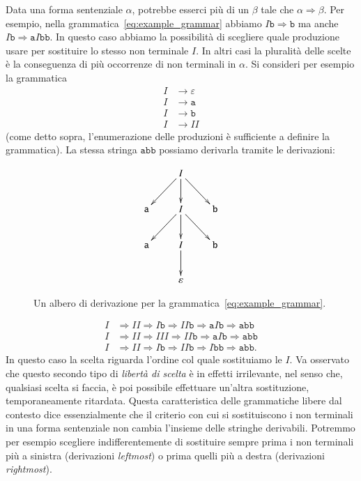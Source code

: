 Data una forma sentenziale $\alpha$, potrebbe esserci pi\`u di un
$\beta$ tale che $\alpha\Rightarrow\beta$. Per esempio, nella
grammatica~\eqref{eq:example_grammar} abbiamo
$I\mathtt{b}\Rightarrow\mathtt{b}$
ma anche $I\mathtt{b}\Rightarrow\mathtt{a}I\mathtt{bb}$.
In questo caso abbiamo la possibilit\`a di scegliere quale produzione
usare per sostituire lo stesso non terminale $I$. In altri casi la
pluralit\`a delle scelte \`e la conseguenza di pi\`u occorrenze
di non terminali in $\alpha$. Si consideri per esempio la grammatica
%
\begin{equation}\label{eq:other_grammar}
\begin{split}
  I&\to\varepsilon\\
  I&\to\mathtt{a}\\
  I&\to\mathtt{b}\\
  I&\to II
\end{split}
\end{equation}
%
(come detto sopra, l'enumerazione delle produzioni \`e sufficiente
a definire la grammatica). La stessa stringa
$\mathtt{abb}$ possiamo derivarla tramite le derivazioni:
%
\begin{figure}[t]
\[
\xymatrix{
  & I\ar[ld]\ar[d]\ar[rd] \\
\mathtt{a} & I\ar[ld]\ar[d]\ar[rd] & \mathtt{b}\\
\mathtt{a} & I\ar[d] & \mathtt{b}\\
  & \varepsilon
}
\]
\caption{Un albero di derivazione per la
         grammatica~\eqref{eq:example_grammar}.}\label{fig:parse_tree}
\end{figure}
%
\begin{equation}\label{eq:many_derivations}
\begin{split}
  I&\Rightarrow II\Rightarrow I\mathtt{b}\Rightarrow II\mathtt{b}
    \Rightarrow\mathtt{a}I\mathtt{b}\Rightarrow\mathtt{abb}\\
  I&\Rightarrow II\Rightarrow III\Rightarrow II\mathtt{b}
    \Rightarrow\mathtt{a}I\mathtt{b}\Rightarrow\mathtt{abb}\\
  I&\Rightarrow II\Rightarrow I\mathtt{b}\Rightarrow II\mathtt{b}
    \Rightarrow I\mathtt{bb}\Rightarrow\mathtt{abb}.
\end{split}
\end{equation}
%
In questo caso la scelta riguarda l'ordine col quale sostituiamo le $I$.
Va osservato che questo secondo tipo di \emph{libert\`a di scelta} \`e
in effetti irrilevante, nel senso che, qualsiasi scelta si faccia, \`e poi
possibile effettuare un'altra sostituzione, temporaneamente
ritardata. Questa caratteristica delle grammatiche libere dal contesto dice
essenzialmente che il criterio con cui si sostituiscono i non terminali
in una forma sentenziale non cambia l'insieme delle stringhe
derivabili. Potremmo per esempio scegliere indifferentemente
di sostituire sempre prima
i non terminali pi\`u a sinistra (derivazioni \emph{leftmost}) o prima
quelli pi\`u a destra (derivazioni \emph{rightmost}).

